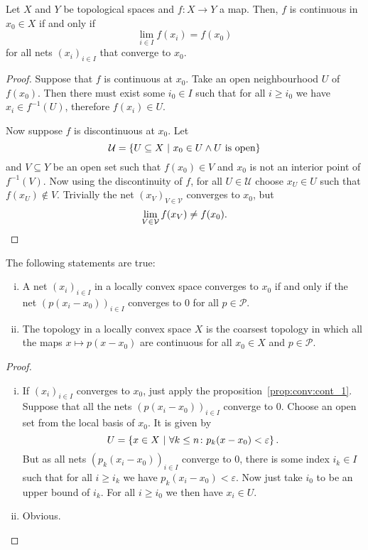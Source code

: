 \begin{trditev}\label{prop:conv:cont_1}
Let $X$ and $Y$ be topological spaces and $f \colon X \to Y$ a map.
Then, $f$ is continuous in $x_0 \in X$ if and only if
\[
\lim_{i \in I} f(x_i) = f(x_0)
\]
for all nets $(x_i)_{i \in I}$ that converge to $x_0$.
\end{trditev}

\begin{proof}
Suppose that $f$ is continuous at $x_0$. Take an open neighbourhood
$U$ of $f(x_0)$. Then there must exist some $i_0 \in I$ such that
for all $i \geq i_0$ we have $x_i \in f^{-1}(U)$, therefore
$f(x_i) \in U$.

Now suppose $f$ is discontinuous at $x_0$. Let
\[
\mathcal{U} =
\left\{U \subseteq X~\middle\vert~x_0 \in U \land \text{$U$ is open}\right\}
\]
and $V \subseteq Y$ be an open set such that $f(x_0) \in V$ and
$x_0$ is not an interior point of $f^{-1}(V)$. Now using the
discontinuity of $f$, for all $U \in \mathcal{U}$ choose
$x_U \in U$ such that $f(x_U) \not \in V$. Trivially the net
$(x_V)_{V \in \mathcal{V}}$ converges to $x_0$, but
\[
\lim_{V \in \mathcal{V}} f(x_V) \ne f(x_0). \qedhere
\]
\end{proof}

\begin{trditev}
The following statements are true:

\begin{enumerate}[i)]
\item A net $(x_i)_{i \in I}$ in a locally convex space converges
to $x_0$ if and only if the net $(p(x_i - x_0))_{i \in I}$
converges to $0$ for all $p \in \mathcal{P}$.
\item The topology in a locally convex space $X$ is the coarsest
topology in which all the maps $x \mapsto p(x - x_0)$ are
continuous for all $x_0 \in X$ and $p \in \mathcal{P}$.
\end{enumerate}
\end{trditev}

\begin{proof}
\phantom{a}
\begin{enumerate}[i)]
\item If $(x_i)_{i \in I}$ converges to $x_0$, just apply the
proposition~\ref{prop:conv:cont_1}. Suppose that all the nets
$(p(x_i - x_0))_{i \in I}$ converge to $0$. Choose an open set from
the local basis of $x_0$. It is given by
\[
U =
\left\{x \in X~\middle\vert~\forall k \leq n \colon p_k(x - x_0) < \varepsilon\right\}.
\]
But as all nets $(p_k(x_i - x_0))_{i \in I}$ converge to $0$, there
is some index $i_k \in I$ such that for all $i \geq i_k$ we have
$p_k(x_i - x_0) < \varepsilon$. Now just take $i_0$ to be an upper
bound of $i_k$. For all $i \geq i_0$ we then have $x_i \in U$.
\item Obvious. \qedhere
\end{enumerate}
\end{proof}

